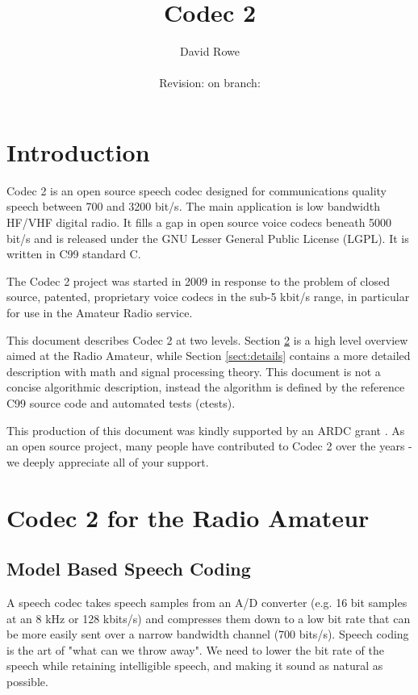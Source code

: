 \documentclass{article}
\title{Codec 2}
\author{David Rowe\\ \\ Revision: {\gitrevision} on branch: {\branch}}
\begin{document}
\maketitle

\section{Introduction}

Codec 2 is an open source speech codec designed for communications quality speech between 700 and 3200 bit/s. The main application is low bandwidth HF/VHF digital radio. It fills a gap in open source voice codecs beneath 5000 bit/s and is released under the GNU Lesser General Public License (LGPL).  It is written in C99 standard C.

The Codec 2 project was started in 2009 in response to the problem of closed source, patented, proprietary voice codecs in the sub-5 kbit/s range, in particular for use in the Amateur Radio service.

This document describes Codec 2 at two levels.  Section \ref{sect:overview} is a high level overview aimed at the Radio Amateur, while Section \ref{sect:details} contains a more detailed description with math and signal processing theory. This document is not a concise algorithmic description, instead the algorithm is defined by the reference C99 source code and automated tests (ctests).

This production of this document was kindly supported by an ARDC grant \cite{ardc2023}.  As an open source project, many people have contributed to Codec 2 over the years - we deeply appreciate all of your support.

\section{Codec 2 for the Radio Amateur}
\label{sect:overview}

\subsection{Model Based Speech Coding}

A speech codec takes speech samples from an A/D converter (e.g. 16 bit samples at an 8 kHz or 128 kbits/s) and compresses them down to a low bit rate that can be more easily sent over a narrow bandwidth channel (700 bits/s).  Speech coding is the art of "what can we throw away". We need to lower the bit rate of the speech while retaining intelligible speech, and making it sound as natural as possible.
\end{document}
